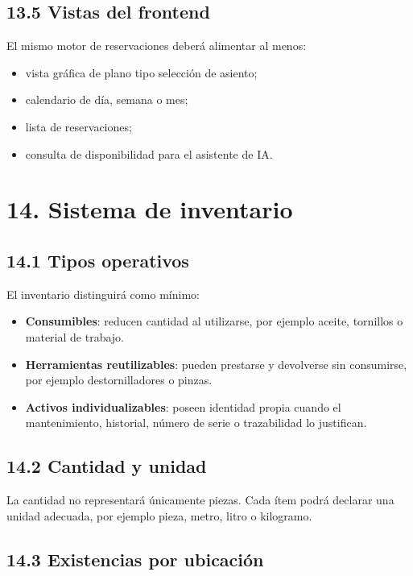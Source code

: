 \documentclass[12pt]{article}
\begin{document}
\subsection*{13.5 Vistas del frontend}

El mismo motor de reservaciones deberá alimentar al menos:

\begin{itemize}[leftmargin=1.2cm]
    \item vista gráfica de plano tipo selección de asiento;
    \item calendario de día, semana o mes;
    \item lista de reservaciones;
    \item consulta de disponibilidad para el asistente de IA.
\end{itemize}

\section*{14. Sistema de inventario}

\subsection*{14.1 Tipos operativos}

El inventario distinguirá como mínimo:

\begin{itemize}[leftmargin=1.2cm]
    \item \textbf{Consumibles}: reducen cantidad al utilizarse, por ejemplo aceite, tornillos o material de trabajo.
    \item \textbf{Herramientas reutilizables}: pueden prestarse y devolverse sin consumirse, por ejemplo destornilladores o pinzas.
    \item \textbf{Activos individualizables}: poseen identidad propia cuando el mantenimiento, historial, número de serie o trazabilidad lo justifican.
\end{itemize}

\subsection*{14.2 Cantidad y unidad}

La cantidad no representará únicamente piezas. Cada ítem podrá declarar una unidad adecuada, por ejemplo pieza, metro, litro o kilogramo.

\subsection*{14.3 Existencias por ubicación}
\end{document}
